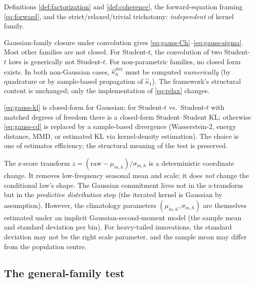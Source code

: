 \documentclass[11pt]{article}
\theoremstyle{definition}
\theoremstyle{plain}
\begin{document}
\begin{description}[leftmargin=2em]
\item[(D1) Algebraic framework.] Definitions \ref{def:factorization}
and \ref{def:coherence}, the forward-equation framing
\eqref{eq:forward}, and the strict/relaxed/trivial trichotomy:
\emph{independent} of kernel family.

\item[(D2) Convolution closed form.] Gaussian-family closure
under convolution gives \eqref{eq:gauss-Ch}--\eqref{eq:gauss-sigma}.
Most other families are not closed. For Student-$t$, the
convolution of two Student-$t$ laws is generically not Student-$t$.
For non-parametric families, no closed form exists. In both
non-Gaussian cases, $\hat\kappa_h^{\mathrm{iter}}$ must be computed
\emph{numerically} (by quadrature or by sample-based propagation
of $\hat\kappa_1$). The framework's structural content is unchanged;
only the implementation of \eqref{eq:relax} changes.

\item[(D3) Test statistic.] \eqref{eq:gauss-kl} is closed-form for
Gaussian; for Student-$t$ vs.\ Student-$t$ with matched degrees of
freedom there is a closed-form Student--Student KL; otherwise
\eqref{eq:gauss-cd} is replaced by a sample-based divergence
(Wasserstein-2, energy distance, MMD, or estimated KL via
kernel-density estimation). The choice is one of estimator
efficiency; the structural meaning of the test is preserved.

\item[(D4) Coordinate standardisation.] The z-score transform
$z = (\mathrm{raw} - \mu_{m,h}) / \sigma_{m,h}$ is a deterministic
coordinate change. It removes low-frequency seasonal mean and
scale; it does \emph{not} change the conditional law's shape. The
Gaussian commitment lives not in the z-transform but in the
\emph{predictive distribution} step (the iterated kernel is
Gaussian by assumption). However, the climatology parameters
$(\mu_{m,h}, \sigma_{m,h})$ are themselves estimated under an
implicit Gaussian-second-moment model (the sample mean and
standard deviation per bin). For heavy-tailed innovations, the
standard deviation may not be the right scale parameter, and the
sample mean may differ from the population centre.
\end{description}

\subsection{The general-family test}
\label{sec:general-test}
\end{document}
